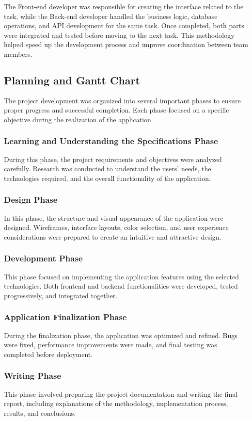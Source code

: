\documentclass[12pt]{article}
\begin{document}
The Front-end developer was responsible for creating the interface related to the task, while the Back-end developer handled the business logic, database operations, and API development for the same task. Once completed, both parts were integrated and tested before moving to the next task.
This methodology helped speed up the development process and improve coordination between team members.

\subsection{Planning and Gantt Chart}
The project development was organized into several important phases to ensure proper progress and successful completion. Each phase focused on a specific objective during the realization of the application

\subsubsection{Learning and Understanding the Specifications Phase}
During this phase, the project requirements and objectives were analyzed carefully. Research was conducted to understand the users’ needs, the technologies required, and the overall functionality of the application.
\subsubsection{Design Phase}
In this phase, the structure and visual appearance of the application were designed. Wireframes, interface layouts, color selection, and user experience considerations were prepared to create an intuitive and attractive design.
\subsubsection{Development Phase}
This phase focused on implementing the application features using the selected technologies. Both frontend and backend functionalities were developed, tested progressively, and integrated together.
\subsubsection{Application Finalization Phase}
During the finalization phase, the application was optimized and refined. Bugs were fixed, performance improvements were made, and final testing was completed before deployment.
\subsubsection{Writing Phase}
This phase involved preparing the project documentation and writing the final report, including explanations of the methodology, implementation process, results, and conclusions.
\end{document}

